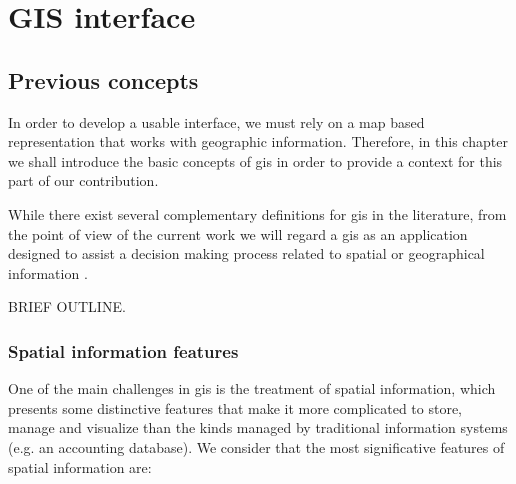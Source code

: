 \part{GIS interface} \label{part:gis}
\chapter{Previous concepts}
\label{ch:gis:prev}
    In order to develop a usable interface, we must rely on a map based representation that works with geographic information. Therefore, in this chapter we shall introduce the basic concepts of \gls{gis} in order to provide a context for this part of our contribution.
    
    While there exist several complementary definitions for \gls{gis} in the literature, from the point of view of the current work we will regard a \gls{gis} as an application designed to assist a decision making process related to spatial or geographical information \cite{harmon2003design,longley2015geographic}.
    
    BRIEF OUTLINE.
    
    \section{Spatial information features}
    One of the main challenges in \gls{gis} is the treatment of spatial information, which presents some distinctive features that make it more complicated to store, manage and visualize than the kinds managed by traditional information systems (e.g. an accounting database). We consider that the most significative features of spatial information are:
    
